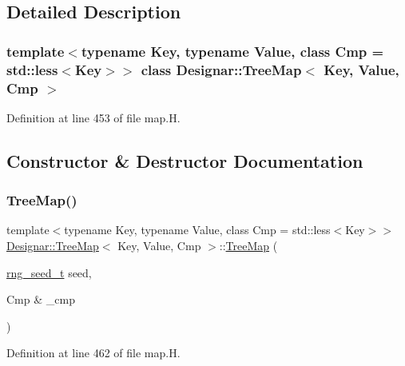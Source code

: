 \subsection{Detailed Description}
\subsubsection*{template$<$typename Key, typename Value, class Cmp = std\+::less$<$\+Key$>$$>$\newline
class Designar\+::\+Tree\+Map$<$ Key, Value, Cmp $>$}



Definition at line 453 of file map.\+H.



\subsection{Constructor \& Destructor Documentation}
\mbox{\label{class_designar_1_1_tree_map_a8f36580c132ec2cf3c1d4cd4ab8a4fa5}} 
\subsubsection{\texorpdfstring{Tree\+Map()}{TreeMap()}\hspace{0.1cm}{\footnotesize\ttfamily [1/7]}}
{\footnotesize\ttfamily template$<$typename Key, typename Value, class Cmp = std\+::less$<$\+Key$>$$>$ \\
\hyperlink{class_designar_1_1_tree_map}{Designar\+::\+Tree\+Map}$<$ Key, Value, Cmp $>$\+::\hyperlink{class_designar_1_1_tree_map}{Tree\+Map} (\begin{DoxyParamCaption}\item[{\hyperlink{namespace_designar_ad621b5646d45288c5d6a1e1dfe7531a8}{rng\+\_\+seed\+\_\+t}}]{seed,  }\item[{Cmp \&}]{\+\_\+cmp }\end{DoxyParamCaption})\hspace{0.3cm}{\ttfamily [inline]}}



Definition at line 462 of file map.\+H.

\mbox{\label{class_designar_1_1_tree_map_ac0bcb95d2b1a18bd59c98ad89c3dc7a4}} 
